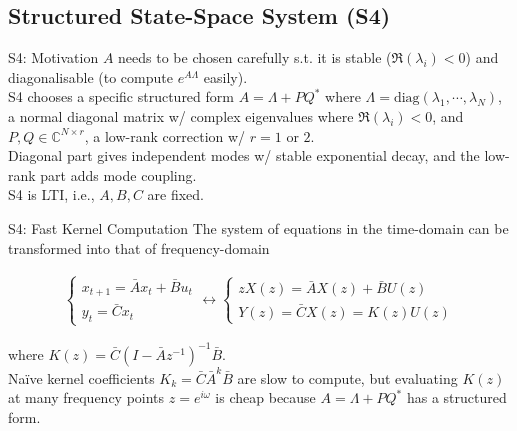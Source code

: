 \documentclass[xcolor=dvipsnames,aspectratio=169]{beamer}
\begin{document}
        \subsection{Structured State-Space System (S4)}
            \begin{frame}{S4: Motivation}
                $A$ needs to be chosen carefully s.t. it is stable ($\Re (\lambda_{i}) < 0$) and diagonalisable (to compute $e^{A \Lambda}$ easily). \\
                S4 chooses a specific structured form $A = \Lambda + PQ^{*}$ where $\Lambda = \mathrm{diag} (\lambda_{1}, \cdots, \lambda_{N})$, a normal diagonal matrix w/ complex eigenvalues where $\Re (\lambda_{i}) < 0$, and $P, Q \in \mathbb{C}^{N \times r}$, a low-rank correction w/ $r = 1 \text{ or } 2$. \\
                Diagonal part gives independent modes w/ stable exponential decay, and the low-rank part adds mode coupling. \\
                S4 is LTI, i.e., $A, B, C$ are fixed.
            \end{frame}

            \begin{frame}{S4: Fast Kernel Computation}
                The system of equations in the time-domain can be transformed into that of frequency-domain
                
                \begin{equation*}
                    \begin{aligned}
                        \begin{cases}
                            x_{t + 1} = \bar{A} x_{t} + \bar{B} u_{t} \\
                            y_{t} = \bar{C} x_{t}
                        \end{cases}
                        \longleftrightarrow
                        \begin{cases}
                            zX(z) = \bar{A} X(z) + \bar{B} U(z) \\
                            Y(z) = \bar{C} X(z) = K(z) U(z)
                        \end{cases}
                    \end{aligned}
                \end{equation*}
                
                where $K(z) = \bar{C} (I - \bar{A} z^{-1})^{-1} \bar{B}$. \\
                Naïve kernel coefficients $K_{k} = \bar{C} \bar{A}^{k} \bar{B}$ are slow to compute, but evaluating $K(z)$ at many frequency points $z = e^{i\omega}$ is cheap because $A = \Lambda + PQ^{*}$ has a structured form.
            \end{frame}
\end{document}
